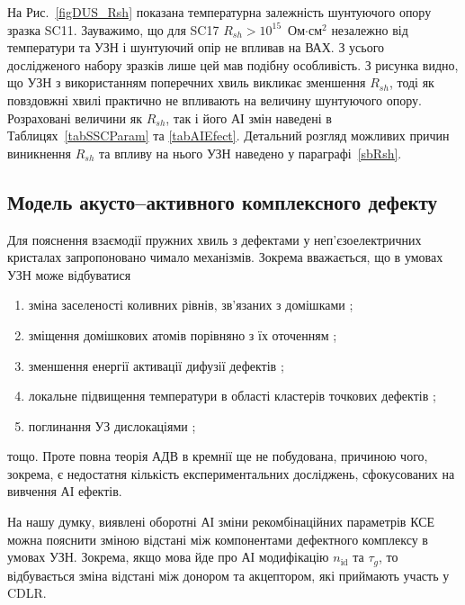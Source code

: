 На Рис.~\ref{figDUS_Rsh} показана температурна залежність шунтуючого опору зразка SC11.
Зауважимо, що для SC17 $R_{sh}>10^{15}$~Ом$\cdot$см$^2$ незалежно від температури та УЗН і
шунтуючий опір не впливав на ВАХ.
З усього дослідженого набору зразків лише цей мав подібну особливість.
З рисунка видно, що УЗН з використанням поперечних хвиль викликає зменшення $R_{sh}$,
тоді як повздовжні хвилі практично не впливають на величину шунтуючого опору.
Розраховані величини як $R_{sh}$, так і його АІ змін наведені в Таблицях~\ref{tabSSCParam} та \ref{tabAIEfect}.
Детальний розгляд можливих причин виникнення $R_{sh}$ та впливу на нього УЗН наведено у параграфі~\ref{sbRsh}.

\subsection{Модель акусто--активного комплексного дефекту\label{sbAEDefect}}

Для пояснення взаємодії пружних хвиль з дефектами у неп'єзоелектричних кристалах
запропоновано чимало механізмів.
Зокрема вважається, що в умовах УЗН може відбуватися
\begin{enumerate}[label=\asbuk*),leftmargin=0em,itemindent=1.5em]
\item зміна заселеності коливних рівнів, зв'язаних з домішками \cite{Pavlovich};
\item зміщення домішкових атомів порівняно з їх оточенням \cite{Korotchenkov1995,MirzadeJAP2011,PELESHCHAK:UPJ2016};
\item зменшення енергії активації дифузії дефектів \cite{Krevchik};
\item локальне підвищення температури в області кластерів точкових дефектів  \cite{MirzadeJAP2005};
\item поглинання УЗ дислокаціями \cite{Davletova2008,OstrovKor92};
\end{enumerate}
тощо.
Проте повна теорія АДВ в кремнії ще не побудована, причиною чого, зокрема, є недостатня
кількість експериментальних досліджень, сфокусованих на вивчення АІ ефектів.

На нашу думку, виявлені оборотні АІ зміни рекомбінаційних параметрів КСЕ можна пояснити зміною
відстані між компонентами дефектного комплексу в умовах УЗН.
Зокрема, якщо мова йде про АІ модифікацію $n_{\mathrm{id}}$ та $\tau_g$,
то відбувається зміна відстані між донором та акцептором, які приймають участь у CDLR.

